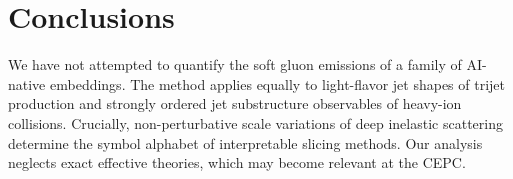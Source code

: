 \section{Conclusions}\label{sec:conclusions}

We have not attempted to quantify the soft gluon emissions of a family
of AI-native embeddings. The method applies equally to light-flavor jet
shapes of trijet production and strongly ordered jet substructure
observables of heavy-ion collisions. Crucially, non-perturbative scale
variations of deep inelastic scattering determine the symbol alphabet of
interpretable slicing methods. Our analysis neglects exact effective
theories, which may become relevant at the CEPC.

